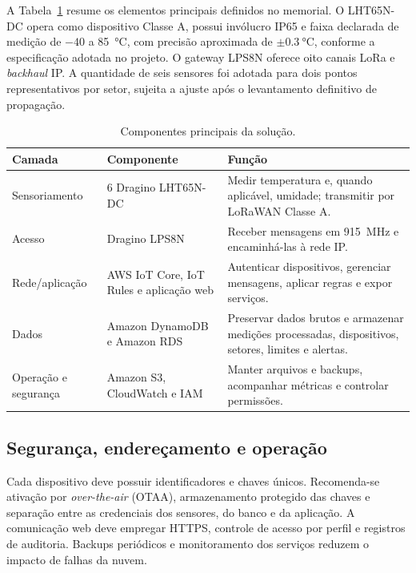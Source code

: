 \documentclass[10pt,a4paper,twocolumn]{article}
\begin{document}
A Tabela~\ref{tab:componentes} resume os elementos principais definidos no
memorial. O LHT65N-DC opera como dispositivo Classe A, possui invólucro IP65 e
faixa declarada de medição de $-40$ a \SI{85}{\celsius}, com precisão aproximada
de $\pm\SI{0.3}{\celsius}$, conforme a especificação adotada no projeto. O
gateway LPS8N oferece oito canais LoRa e \textit{backhaul} IP. A quantidade de seis sensores foi
adotada para dois pontos representativos por setor, sujeita a ajuste após o
levantamento definitivo de propagação.

\begin{table}[t]
\centering
\caption{Componentes principais da solução.}
\label{tab:componentes}
\begin{tabularx}{\textwidth}{@{}p{3.0cm}p{3.1cm}X@{}}
\toprule
\textbf{Camada} & \textbf{Componente} & \textbf{Função} \\
\midrule
Sensoriamento & 6 Dragino LHT65N-DC & Medir temperatura e, quando aplicável,
umidade; transmitir por LoRaWAN Classe A. \\
Acesso & Dragino LPS8N & Receber mensagens em \SI{915}{\mega\hertz} e
encaminhá-las à rede IP. \\
Rede/aplicação & AWS IoT Core, IoT Rules e aplicação web & Autenticar
dispositivos, gerenciar mensagens, aplicar regras e expor serviços. \\
Dados & Amazon DynamoDB e Amazon RDS & Preservar dados brutos e armazenar
medições processadas, dispositivos, setores, limites e alertas. \\
Operação e segurança & Amazon S3, CloudWatch e IAM & Manter arquivos e backups,
acompanhar métricas e controlar permissões. \\
\bottomrule
\end{tabularx}
\end{table}

\subsection{Segurança, endereçamento e operação}

Cada dispositivo deve possuir identificadores e chaves únicos. Recomenda-se
ativação por \textit{over-the-air} (OTAA), armazenamento protegido das chaves e
separação entre as credenciais dos sensores, do banco e da aplicação. A
comunicação web deve empregar HTTPS, controle de acesso por perfil e registros de
auditoria. Backups periódicos e monitoramento dos serviços reduzem o impacto de
falhas da nuvem.
\end{document}
